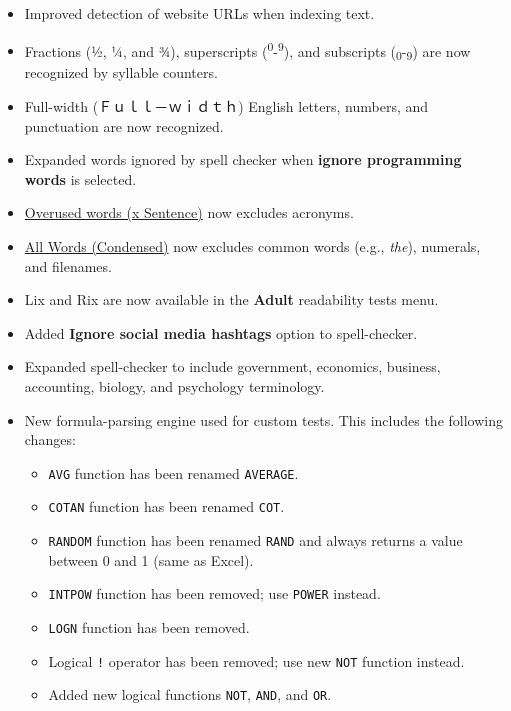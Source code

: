 \documentclass[
]{book}
\providecommand{\tightlist}{%
  \setlength{\itemsep}{0pt}\setlength{\parskip}{0pt}}
\theoremstyle{definition}
\theoremstyle{definition}
\theoremstyle{definition}
\theoremstyle{definition}
\theoremstyle{remark}
\begin{document}
\begin{itemize}
\item
  Improved detection of website URLs when indexing text.
\item
  Fractions (½, ¼, and ¾), superscripts (\textsuperscript{0}-\textsuperscript{9}), and subscripts (\textsubscript{0}-\textsubscript{9}) are now recognized by syllable counters.
\item
  Full-width (Ｆｕｌｌ－ｗｉｄｔｈ) English letters, numbers, and punctuation are now recognized.
\item
  Expanded words ignored by spell checker when \textbf{ignore programming words} is selected.
\item
  \protect\hyperlink{reviewing-overused-by-sentence}{Overused words (x Sentence)} now excludes acronyms.
\item
  \protect\hyperlink{reviewing-word-breakdowns}{All Words (Condensed)} now excludes common words (e.g., \emph{the}), numerals, and filenames.
\item
  Lix and Rix are now available in the \textbf{Adult} readability tests menu.
\item
  Added \textbf{Ignore social media hashtags} option to spell-checker.
\item
  Expanded spell-checker to include government, economics, business, accounting, biology, and psychology terminology.
\item
  New formula-parsing engine used for custom tests. This includes the following changes:

  \begin{itemize}
  \tightlist
  \item
    \texttt{AVG} function has been renamed \texttt{AVERAGE}.
  \item
    \texttt{COTAN} function has been renamed \texttt{COT}.
  \item
    \texttt{RANDOM} function has been renamed \texttt{RAND} and always returns a value between 0 and 1 (same as Excel).
  \item
    \texttt{INTPOW} function has been removed; use \texttt{POWER} instead.
  \item
    \texttt{LOGN} function has been removed.
  \item
    Logical \texttt{!} operator has been removed; use new \texttt{NOT} function instead.
  \item
    Added new logical functions \texttt{NOT}, \texttt{AND}, and \texttt{OR}.
  \end{itemize}
\end{itemize}
\end{document}
